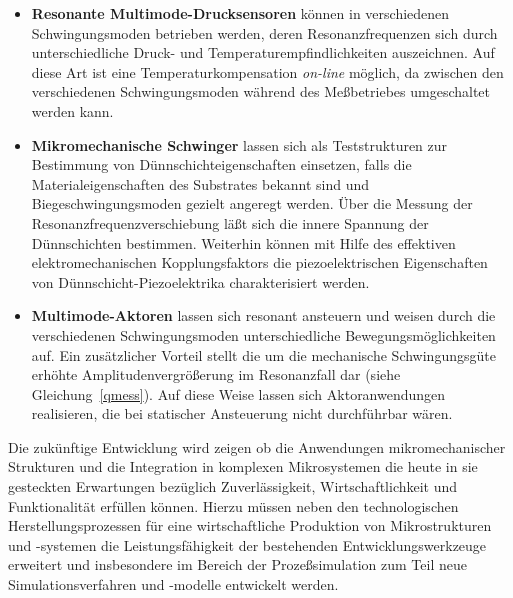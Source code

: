 \begin{itemize}
\item
{\bf Resonante Multimode-Drucksensoren} können in verschiedenen
Schwingungsmoden betrieben werden, deren Resonanzfrequenzen sich
durch unterschiedliche Druck- und Temperaturempfindlichkeiten auszeichnen.
Auf diese Art ist eine Temperaturkompensation {\em on-line} möglich, da
zwischen den verschiedenen Schwingungsmoden während des Meßbetriebes
umgeschaltet werden kann.
\item
{\bf Mikromechanische Schwinger} lassen sich als Teststrukturen zur
Bestimmung von Dünnschichteigenschaften einsetzen, falls die
Materialeigenschaften des Substrates bekannt sind und
Biegeschwingungsmoden gezielt angeregt werden. Über die Messung der
Resonanzfrequenzverschiebung läßt sich die innere Spannung der Dünnschichten
bestimmen. Weiterhin können mit Hilfe des effektiven elektromechanischen
Kopplungsfaktors die piezoelektrischen Eigenschaften von
Dünnschicht-Piezoelektrika charakterisiert werden.
\item
{\bf Multimode-Aktoren} lassen sich resonant ansteuern und weisen durch
die verschiedenen Schwingungsmoden unterschiedliche Bewegungsmöglichkeiten
auf. Ein zusätzlicher Vorteil stellt die um die mechanische Schwingungsgüte
erhöhte Amplitudenvergrößerung im Resonanzfall dar (siehe
Gleichung~\ref{qmess}). Auf diese Weise lassen sich Aktoranwendungen
realisieren, die bei statischer Ansteuerung nicht durchführbar wären.
\end{itemize}
%
Die zukünftige Entwicklung wird zeigen ob die Anwendungen mikromechanischer
Strukturen und die Integration in komplexen Mikrosystemen
die heute in sie gesteckten Erwartungen bezüglich Zuverlässigkeit,
Wirtschaftlichkeit und Funktionalität erfüllen können.
Hierzu müssen neben den technologischen Herstellungsprozessen für eine
wirtschaftliche Produktion von Mikrostrukturen und -systemen die
Leistungsfähigkeit der bestehenden Entwicklungswerkzeuge erweitert und
insbesondere im Bereich der Prozeßsimulation zum Teil neue
Simulationsverfahren und -modelle entwickelt werden.

